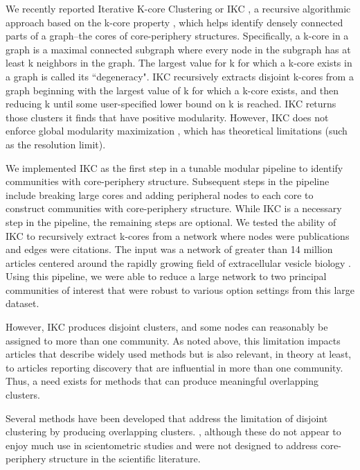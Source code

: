 \documentclass[12pt, oneside]{article}   	%
\begin{document}
We recently reported Iterative K-core Clustering or IKC \citep{Wedell2022}, a recursive algorithmic approach based on the k-core property \citep{Giatsidis2011,malliaros2019}, which helps identify densely connected parts of a graph--the cores of core-periphery structures. 
Specifically, a k-core in a graph is a maximal connected subgraph where every node in the subgraph has at least k neighbors in the graph.
The largest value for k for which a k-core exists in a graph is called its ``degeneracy". 
IKC recursively extracts disjoint k-cores from a graph beginning with the largest value of k for which a  k-core  exists, and then reducing k until some user-specified lower bound on k is reached. 
IKC returns those clusters it finds that have positive modularity. 
However, 
IKC does not enforce global modularity maximization \citep{lancichinetti2011limits}, which has theoretical limitations (such as the resolution limit). 

We implemented IKC as the first step in a tunable modular pipeline to identify communities with core-periphery structure. 
Subsequent steps in the pipeline include breaking large cores and adding peripheral nodes to each core to construct communities with core-periphery structure. While IKC is a necessary step in the pipeline, the remaining steps are optional. We tested the ability of IKC to recursively extract k-cores from a network where nodes were publications and edges were citations. The input was a network of greater than 14 million articles centered around the rapidly growing field of extracellular vesicle biology \citep{Wedell2022}. Using this pipeline, we were able to reduce a large network to two principal communities of interest that were robust to various option settings \citep[Figure 5]{Wedell2022} from this large dataset.
	
However, IKC produces disjoint clusters, and some nodes can reasonably be assigned to more than one community.  As noted above, this limitation impacts articles that describe widely used methods but is also relevant, in theory at least, to articles reporting discovery that are influential in more than one community.  Thus, a need exists for methods that can produce meaningful overlapping clusters. 
	
Several methods have been developed that address the limitation of disjoint clustering by producing overlapping clusters. \citep{Baumes2005,Palla2005,banerjee2005model,Cleuziou2008,Lancichinetti2009,Lu2012,yang2013overlapping}, although these do not appear to enjoy much use in scientometric studies and were not designed to address core-periphery structure in the scientific literature. 
\end{document}
